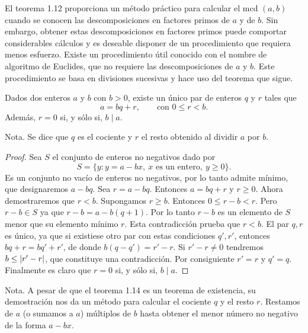 \documentclass[12pt,a4paper]{book}
\begin{document}
    El teorema 1.12 proporciona un método práctico para calcular el mcd $(a,b)$ cuando se
    conocen las descomposiciones en factores primos de $a$ y de $b$. Sin embargo, obtener
    estas descomposiciones en factores primos puede comportar considerables cálculos y es
    deseable disponer de un procedimiento que requiera menos esfuerzo. Existe un
    procedimiento útil conocido con el nombre de algoritmo de Euclides, que no requiere las
    descomposiciones de $a$ y $b$. Este procedimiento se basa en divisiones sucesivas y hace
    uso del teorema que sigue.

    \begin{teorema}
        Dados dos enteros $a$ y $b$ con $b>0$, existe un único par de enteros $q$ y $r$ tales
        que
        \begin{equation*}
            a=bq+r,\qquad\text{con } 0\leq r<b.
        \end{equation*}
        Además, $r=0$ si, y sólo si, $b\mid a$.
    \end{teorema}

    Nota. Se dice que $q$ es el cociente y $r$ el resto obtenido al dividir $a$ por $b$.

    \begin{proof}
        Sea $S$ el conjunto de enteros no negativos dado por
        \begin{equation*}
            S=\{y:y=a-bx,\ x\text{ es un entero},\ y\geq0\}.
        \end{equation*}
        Es un conjunto no vacío de enteros no negativos, por lo tanto admite mínimo, que
        designaremos $a-bq$. Sea $r=a-bq$. Entonces $a=bq+r$ y $r\geq0$. Ahora demostraremos
        que $r<b$. Supongamos $r\geq b$. Entonces $0\leq r-b<r$. Pero $r-b\in S$ ya que
        $r-b=a-b(q+1)$. Por lo tanto $r-b$ es un elemento de $S$ menor que su elemento
        mínimo $r$. Esta contradicción prueba que $r<b$. El par $q,r$ es único, ya que si
        existiese otro par con estas condiciones $q',r'$, entonces $bq+r=bq'+r'$, de donde
        $b(q-q')=r'-r$. Si $r'-r\neq0$ tendremos $b\leq\abs{r'-r}$, que constituye una
        contradicción. Por consiguiente $r'=r$ y $q'=q$. Finalmente es claro que $r=0$ si, y
        sólo si, $b\mid a$.
    \end{proof}

    Nota. A pesar de que el teorema 1.14 es un teorema de existencia, su demostración nos da
    un método para calcular el cociente $q$ y el resto $r$. Restamos de $a$ (o sumamos a $a$)
    múltiplos de $b$ hasta obtener el menor número no negativo de la forma $a-bx$.
\end{document}
